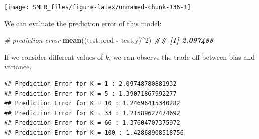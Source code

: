 \documentclass[
]{book}
\newenvironment{Shaded}{\begin{snugshade}}{\end{snugshade}}
\newcommand{\AttributeTok}[1]{\textcolor[rgb]{0.13,0.29,0.53}{#1}}
\newcommand{\CommentTok}[1]{\textcolor[rgb]{0.56,0.35,0.01}{\textit{#1}}}
\newcommand{\DecValTok}[1]{\textcolor[rgb]{0.00,0.00,0.81}{#1}}
\newcommand{\DocumentationTok}[1]{\textcolor[rgb]{0.56,0.35,0.01}{\textbf{\textit{#1}}}}
\newcommand{\FunctionTok}[1]{\textcolor[rgb]{0.13,0.29,0.53}{\textbf{#1}}}
\newcommand{\NormalTok}[1]{#1}
\newcommand{\OtherTok}[1]{\textcolor[rgb]{0.56,0.35,0.01}{#1}}
\newcommand{\SpecialCharTok}[1]{\textcolor[rgb]{0.81,0.36,0.00}{\textbf{#1}}}
\newcommand{\StringTok}[1]{\textcolor[rgb]{0.31,0.60,0.02}{#1}}
\theoremstyle{definition}
\theoremstyle{definition}
\theoremstyle{definition}
\theoremstyle{definition}
\theoremstyle{remark}
\begin{document}
\begin{Shaded}
\end{Shaded}

\begin{center}\texttt{[image: SMLR\_files/figure-latex/unnamed-chunk-136-1]} \end{center}

We can evaluate the prediction error of this model:

\begin{Shaded}
\begin{Highlighting}[]
  \CommentTok{\# prediction error}
  \FunctionTok{mean}\NormalTok{((test.pred }\SpecialCharTok{{-}}\NormalTok{ test.y)}\SpecialCharTok{\^{}}\DecValTok{2}\NormalTok{)}
\DocumentationTok{\#\# [1] 2.097488}
\end{Highlighting}
\end{Shaded}

If we consider different values of \(k\), we can observe the trade-off between bias and variance.

\begin{verbatim}
## Prediction Error for K = 1 : 2.09748780881932
## Prediction Error for K = 5 : 1.39071867992277
## Prediction Error for K = 10 : 1.24696415340282
## Prediction Error for K = 33 : 1.21589627474692
## Prediction Error for K = 66 : 1.37604707375972
## Prediction Error for K = 100 : 1.42868908518756
\end{verbatim}
\end{document}
